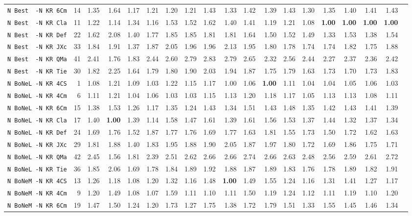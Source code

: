 \begin{tabular}{l | r @{~~} r | r@{~~}r@{~~}r@{~~}r@{~~}r@{~~}r@{~~}r@{~~}r@{~~}r@{~~}r@{~~}r@{~~}r@{~~}r@{~~}r@{~~}r@{~~}r|}
\verb+N Best  -N KR 6Cm+ & 14 & 1.35 & 1.64&1.17&1.21&1.20&1.21&1.43&1.33&1.42&1.39&1.43&1.30&1.35&1.40&1.41&1.43\\
\verb+N Best  -N KR Cla+ & 11 & 1.22 & 1.14&1.34&1.16&1.53&1.52&1.62&1.40&1.41&1.19&1.21&1.08&\textbf{1.00}&\textbf{1.00}&\textbf{1.00}&\textbf{1.00}\\
\verb+N Best  -N KR Def+ & 22 & 1.62 & 2.08&1.40&1.77&1.85&1.85&1.81&1.81&1.64&1.50&1.52&1.49&1.33&1.53&1.38&1.54\\
\verb+N Best  -N KR JXc+ & 33 & 1.84 & 1.91&1.37&1.87&2.05&1.96&1.96&2.13&1.95&1.80&1.78&1.74&1.74&1.82&1.75&1.88\\
\verb+N Best  -N KR QMa+ & 41 & 2.41 & 1.76&1.83&2.44&2.60&2.79&2.83&2.79&2.65&2.32&2.56&2.44&2.27&2.37&2.36&2.42\\
\verb+N Best  -N KR Tie+ & 30 & 1.82 & 2.25&1.64&1.79&1.80&1.90&2.03&1.94&1.87&1.75&1.79&1.63&1.73&1.70&1.73&1.83\\
\verb+N BoNeL -N KR 4CS+ & 1 & 1.08 & 1.21&1.09&1.03&1.22&1.15&1.17&1.00&1.06&\textbf{1.00}&1.11&1.04&1.04&1.05&1.06&1.03\\
\verb+N BoNeL -N KR 4Cm+ & 6 & 1.11 & 1.21&1.04&1.06&1.03&1.03&1.15&1.13&1.20&1.18&1.17&1.05&1.13&1.13&1.08&1.11\\
\verb+N BoNeL -N KR 6Cm+ & 15 & 1.38 & 1.53&1.26&1.17&1.35&1.24&1.43&1.34&1.51&1.43&1.48&1.35&1.42&1.43&1.41&1.39\\
\verb+N BoNeL -N KR Cla+ & 17 & 1.40 & \textbf{1.00}&1.39&1.14&1.58&1.47&1.61&1.39&1.61&1.56&1.53&1.37&1.44&1.32&1.37&1.34\\
\verb+N BoNeL -N KR Def+ & 24 & 1.69 & 1.76&1.52&1.87&1.77&1.76&1.69&1.77&1.63&1.81&1.55&1.73&1.50&1.72&1.62&1.63\\
\verb+N BoNeL -N KR JXc+ & 29 & 1.81 & 1.88&1.40&1.83&1.95&1.88&1.90&2.05&1.87&1.97&1.80&1.72&1.69&1.86&1.75&1.71\\
\verb+N BoNeL -N KR QMa+ & 42 & 2.45 & 1.56&1.81&2.39&2.51&2.62&2.66&2.66&2.74&2.66&2.63&2.48&2.56&2.59&2.61&2.72\\
\verb+N BoNeL -N KR Tie+ & 36 & 1.85 & 2.06&1.69&1.78&1.84&1.89&1.92&1.88&1.87&1.89&1.83&1.76&1.78&1.89&1.82&1.91\\
\verb+N BoNeM -N KR 4CS+ & 13 & 1.26 & 1.18&1.08&1.20&1.32&1.16&1.48&\textbf{1.00}&1.49&1.55&1.24&1.16&1.31&1.41&1.27&1.17\\
\verb+N BoNeM -N KR 4Cm+ & 9 & 1.20 & 1.49&1.08&1.07&1.59&1.11&1.10&1.11&1.50&1.19&1.24&1.12&1.11&1.19&1.10&1.20\\
\verb+N BoNeM -N KR 6Cm+ & 19 & 1.47 & 1.50&1.24&1.20&1.73&1.27&1.75&1.38&1.72&1.79&1.51&1.33&1.55&1.45&1.46&1.34\\

\end{tabular}
